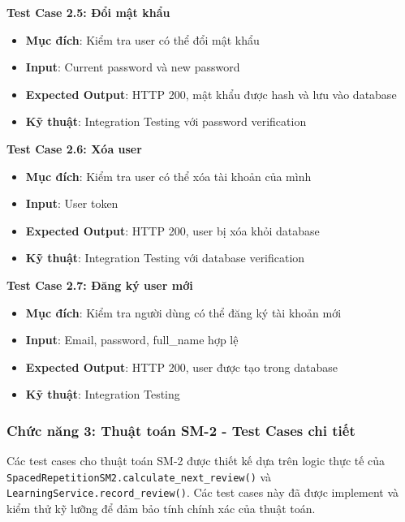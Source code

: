 \documentclass[../DoAn.tex]{subfiles}
\begin{document}
\textbf{Test Case 2.5: Đổi mật khẩu}
\begin{itemize}
    \item \textbf{Mục đích}: Kiểm tra user có thể đổi mật khẩu
    \item \textbf{Input}: Current password và new password
    \item \textbf{Expected Output}: HTTP 200, mật khẩu được hash và lưu vào database
    \item \textbf{Kỹ thuật}: Integration Testing với password verification
\end{itemize}

\textbf{Test Case 2.6: Xóa user}
\begin{itemize}
    \item \textbf{Mục đích}: Kiểm tra user có thể xóa tài khoản của mình
    \item \textbf{Input}: User token
    \item \textbf{Expected Output}: HTTP 200, user bị xóa khỏi database
    \item \textbf{Kỹ thuật}: Integration Testing với database verification
\end{itemize}

\textbf{Test Case 2.7: Đăng ký user mới}
\begin{itemize}
    \item \textbf{Mục đích}: Kiểm tra người dùng có thể đăng ký tài khoản mới
    \item \textbf{Input}: Email, password, full\_name hợp lệ
    \item \textbf{Expected Output}: HTTP 200, user được tạo trong database
    \item \textbf{Kỹ thuật}: Integration Testing
\end{itemize}


\subsubsection{Chức năng 3: Thuật toán SM-2 - Test Cases chi tiết}

Các test cases cho thuật toán SM-2 được thiết kế dựa trên logic thực tế của \texttt{SpacedRepetitionSM2.calculate\_next\_review()} và \texttt{LearningService.record\_review()}. Các test cases này đã được implement và kiểm thử kỹ lưỡng để đảm bảo tính chính xác của thuật toán.
\end{document}
